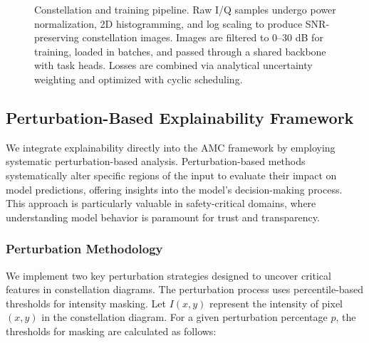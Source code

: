 \documentclass{ELSP}
\begin{document}
\begin{figure}[t]
{%
  }%
  \caption{Constellation and training pipeline. Raw I/Q samples undergo power normalization, 2D histogramming, and log scaling to produce SNR-preserving constellation images. Images are filtered to 0--30 dB for training, loaded in batches, and passed through a shared backbone with task heads. Losses are combined via analytical uncertainty weighting and optimized with cyclic scheduling.}
  \label{fig:pipeline}
\end{figure}

\subsection{Perturbation-Based Explainability Framework}

We integrate explainability directly into the AMC framework by employing systematic perturbation-based analysis. Perturbation-based methods systematically alter specific regions of the input to evaluate their impact on model predictions, offering insights into the model's decision-making process. This approach is particularly valuable in safety-critical domains, where understanding model behavior is paramount for trust and transparency.

\subsubsection{Perturbation Methodology}

We implement two key perturbation strategies designed to uncover critical features in constellation diagrams. The perturbation process uses percentile-based thresholds for intensity masking. Let $I(x,y)$ represent the intensity of pixel $(x,y)$ in the constellation diagram. For a given perturbation percentage $p$, the thresholds for masking are calculated as follows:
\end{document}
